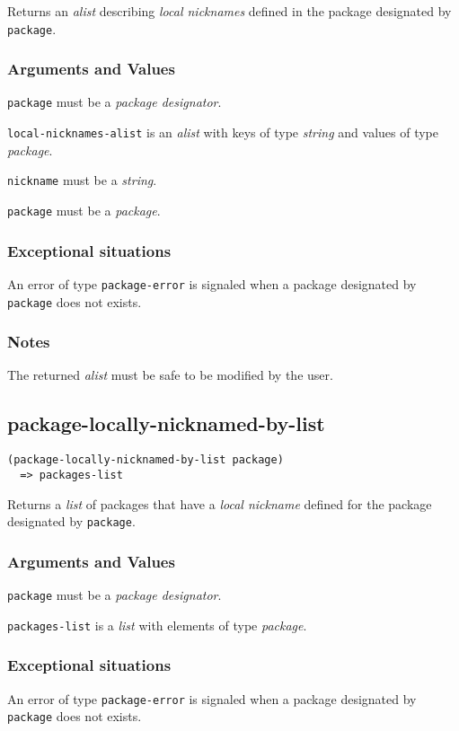 \documentclass[11pt]{article}
\begin{document}
Returns an \emph{alist} describing \emph{local nicknames} defined in the package designated
by \texttt{package}.
\subsubsection{Arguments and Values}
\label{sec:org388e6af}
\texttt{package} must be a \emph{package designator}.

\texttt{local-nicknames-alist} is an \emph{alist} with keys of type \emph{string} and values of
type \emph{package}.

\texttt{nickname} must be a \emph{string}.

\texttt{package} must be a \emph{package}.
\subsubsection{Exceptional situations}
\label{sec:org19feabd}
An error of type \texttt{package-error} is signaled when a package designated by
\texttt{package} does not exists.
\subsubsection{Notes}
\label{sec:org5c431c3}
The returned \emph{alist} must be safe to be modified by the user.
\subsection{package-locally-nicknamed-by-list}
\label{sec:org0337449}
\begin{verbatim}
(package-locally-nicknamed-by-list package)
  => packages-list
\end{verbatim}

Returns a \emph{list} of packages that have a \emph{local nickname} defined for the package
designated by \texttt{package}.
\subsubsection{Arguments and Values}
\label{sec:org8b40c82}
\texttt{package} must be a \emph{package designator}.

\texttt{packages-list} is a \emph{list} with elements of type \emph{package}.
\subsubsection{Exceptional situations}
\label{sec:org1d6143c}
An error of type \texttt{package-error} is signaled when a package designated by
\texttt{package} does not exists.
\end{document}
